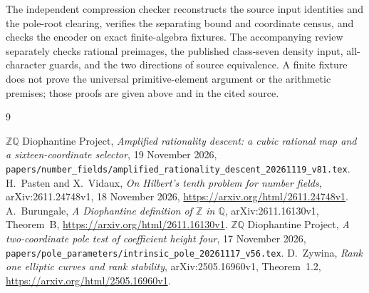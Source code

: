 \documentclass[11pt,a4paper]{article}
\newcommand{\Q}{\mathbb Q}\newcommand{\Z}{\mathbb Z}
\begin{document}
The independent compression checker reconstructs the source input
identities and the pole-root clearing, verifies the separating bound
and coordinate census, and checks the encoder on exact finite-algebra
fixtures. The accompanying review separately checks rational preimages,
the published class-seven density input, all-character guards, and the
two directions of source equivalence. A finite fixture does not prove
the universal primitive-element argument or the arithmetic premises;
those proofs are given above and in the cited source.

\begin{thebibliography}{9}\footnotesize\raggedright
\setlength{\itemsep}{1pt}
 \(\Z\Q\) Diophantine Project,
\emph{Amplified rationality descent: a cubic rational map and a
sixteen-coordinate selector}, 19 November 2026,
\nolinkurl{papers/number_fields/amplified_rationality_descent_20261119_v81.tex}.
 H.~Pasten and X.~Vidaux,
\emph{On Hilbert's tenth problem for number fields},
arXiv:2611.24748v1, 18 November 2026,
\url{https://arxiv.org/html/2611.24748v1}.
 A.~Burungale,
\emph{A Diophantine definition of \(\Z\) in \(\Q\)},
arXiv:2611.16130v1, Theorem~B,
\url{https://arxiv.org/html/2611.16130v1}.
 \(\Z\Q\) Diophantine Project,
\emph{A two-coordinate pole test of coefficient height four},
17 November 2026,
\nolinkurl{papers/pole_parameters/intrinsic_pole_20261117_v56.tex}.
 D.~Zywina,
\emph{Rank one elliptic curves and rank stability},
arXiv:2505.16960v1, Theorem~1.2,
\url{https://arxiv.org/html/2505.16960v1}.
\end{thebibliography}
\end{document}
